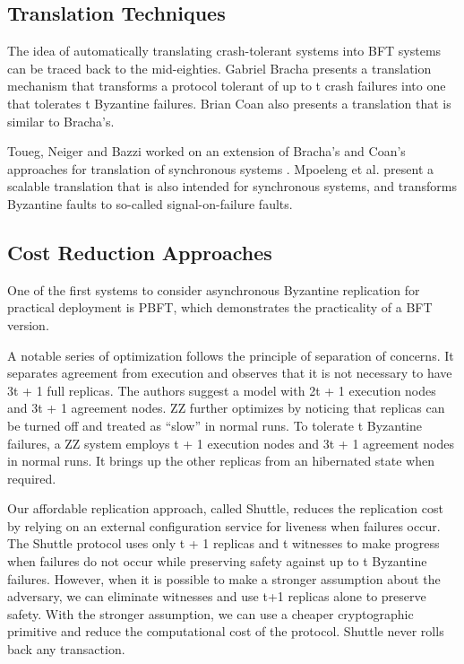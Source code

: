 \documentclass[letterpaper, 10 pt, conference]{ieeeconf}  %
\begin{document}
\subsection{Translation Techniques}
The idea of automatically translating crash-tolerant systems into BFT systems can be traced back to the mid-eighties. Gabriel Bracha presents a translation mechanism that transforms a protocol tolerant of up to t crash failures into one that tolerates t Byzantine failures. Brian Coan also presents a translation that is similar to Bracha’s.

Toueg, Neiger and Bazzi worked on an extension of Bracha’s and Coan’s approaches for translation of synchronous systems . Mpoeleng et al. present a scalable translation that is also intended for synchronous systems, and transforms Byzantine faults to so-called signal-on-failure faults.

\subsection{Cost Reduction Approaches}
One of the first systems to consider asynchronous Byzantine replication for practical deployment is PBFT, which demonstrates the practicality of a BFT version.

A notable series of optimization follows the principle of separation of concerns. It separates agreement from execution and observes that it is not necessary to have 3t + 1 full replicas. The authors suggest a model with 2t + 1 execution nodes  and 3t + 1 agreement nodes. ZZ further optimizes by noticing that replicas can be turned off and treated as “slow” in normal runs. To tolerate t Byzantine failures, a ZZ system employs t + 1 execution nodes and 3t + 1 agreement nodes in normal runs. It brings up the other replicas from an hibernated state when required.

Our affordable replication approach, called Shuttle, reduces the replication cost by relying on an external configuration service for liveness when failures occur. The Shuttle protocol uses only t + 1 replicas and t witnesses to make progress when failures do not occur while preserving safety against up to t Byzantine failures. However, when it is possible to make a stronger assumption about the adversary, we can eliminate witnesses and use t+1 replicas alone to preserve safety. With the stronger assumption, we can use a cheaper cryptographic primitive and reduce the computational cost of the protocol. Shuttle never rolls back any transaction.
\end{document}
